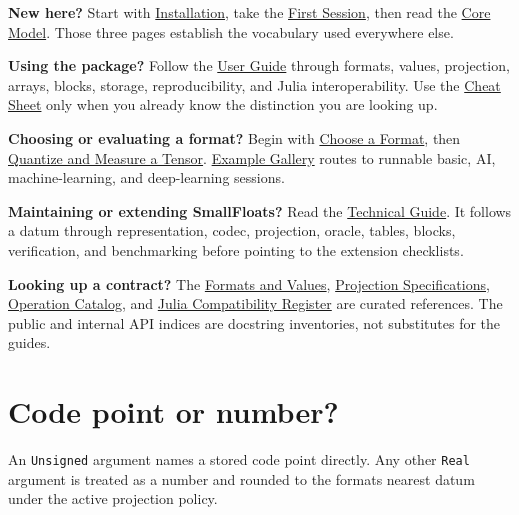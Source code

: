 \textbf{New here?} Start with \href{install\_\allowbreak{}and\_\allowbreak{}verify.md}{Installation}, take the \href{first\_\allowbreak{}session.md}{First Session}, then read the \href{core\_\allowbreak{}model.md}{Core Model}. Those three pages establish the vocabulary used everywhere else.



\textbf{Using the package?} Follow the \href{user\_\allowbreak{}guide.md}{User Guide} through formats, values, projection, arrays, blocks, storage, reproducibility, and Julia interoperability. Use the \href{help\_\allowbreak{}cheat\_\allowbreak{}sheet.md}{Cheat Sheet} only when you already know the distinction you are looking up.



\textbf{Choosing or evaluating a format?} Begin with \href{workflow\_\allowbreak{}choose\_\allowbreak{}format.md}{Choose a Format}, then \href{workflow\_\allowbreak{}quantize\_\allowbreak{}measure.md}{Quantize and Measure a Tensor}. \href{examples\_\allowbreak{}gallery.md}{Example Gallery} routes to runnable basic, AI, machine-learning, and deep-learning sessions.



\textbf{Maintaining or extending SmallFloats?} Read the \href{technical\_\allowbreak{}guide.md}{Technical Guide}. It follows a datum through representation, codec, projection, oracle, tables, blocks, verification, and benchmarking before pointing to the extension checklists.



\textbf{Looking up a contract?} The \href{reference\_\allowbreak{}formats\_\allowbreak{}values.md}{Formats and Values}, \href{reference\_\allowbreak{}projections.md}{Projection Specifications}, \href{reference\_\allowbreak{}operations.md}{Operation Catalog}, and \href{reference\_\allowbreak{}julia\_\allowbreak{}compat.md}{Julia Compatibility Register} are curated references. The public and internal API indices are docstring inventories, not substitutes for the guides.



\section{Code point or number?}



\label{4514394557095688065}{}


An \texttt{Unsigned} argument names a stored code point directly. Any other \texttt{Real} argument is treated as a number and rounded to the format{\textquotesingle}s nearest datum under the active projection policy.




